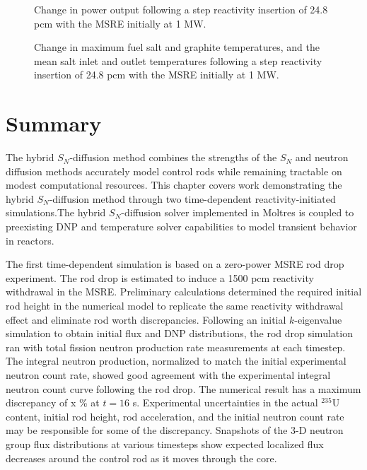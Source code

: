 \begin{figure}[t]
  \centering
  \caption{Change in power output following a step reactivity insertion of 24.8 pcm with the
  \gls{MSRE} initially at 1 MW.}
  \label{fig:insertion-power}
\end{figure}

\begin{figure}[t]
  \centering
  \caption{Change in maximum fuel salt and graphite temperatures, and the mean salt inlet and outlet
  temperatures following a step reactivity insertion of 24.8 pcm with the \gls{MSRE} initially at 1
  MW.}
  \label{fig:insertion-temperature}
\end{figure}

\section{Summary} \label{sec:transient-summary}

The hybrid $S_N$-diffusion method combines the strengths of the $S_N$ and neutron
diffusion methods accurately model control rods while remaining tractable on modest computational
resources. This chapter covers work demonstrating the hybrid $S_N$-diffusion method through two
time-dependent reactivity-initiated simulations.The hybrid $S_N$-diffusion solver implemented in
Moltres is coupled to preexisting \gls{DNP} and temperature solver capabilities to model
transient behavior in reactors. 

The first time-dependent simulation is based on a zero-power \gls{MSRE} rod drop experiment. The
rod drop is estimated to induce a 1500 pcm reactivity withdrawal in the \gls{MSRE}. Preliminary
calculations determined the required initial rod height in the numerical model to replicate the
same reactivity withdrawal effect and eliminate rod worth discrepancies. Following an initial
$k$-eigenvalue simulation to obtain initial flux and \gls{DNP} distributions, the rod drop
simulation ran with total fission neutron production rate measurements at each timestep. The
integral neutron production, normalized to match the initial experimental neutron count rate,
showed good agreement with the experimental integral neutron count curve following the rod drop.
The numerical result has a maximum discrepancy of x \% at $t=16$ s. Experimental uncertainties in
the actual $^{235}$U content, initial rod height, rod acceleration, and the initial neutron count
rate may be responsible for some of the discrepancy. Snapshots of the 3-D neutron group flux
distributions at various timesteps show expected localized flux decreases around the control rod
as it moves through the core.

